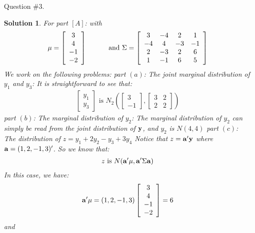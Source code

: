 \documentclass[11pt]{article}
\newtheorem{sol}{Solution}
\begin{document}
Question $\# 3.$
\begin{sol}
	For part $[A]$:\vskip 2mm
	with 
	\begin{align*}
		{\bf \mu} = \left[\begin{array}{c}3\\ 4\\ -1\\ -2\end{array}\right]\hskip 1cm \text{ and }\Sigma = \left[\begin{array}{cccc}3&-4&2&1\\ -4&4&-3&-1\\ 2&-3&2&6\\ 1&-1&6&5\end{array}\right]
	\end{align*}
	We work on the following problems:\vskip 2mm
	part $(a)$:\vskip 2mm
	The joint marginal distribution of $y_{1}$ and $y_3$:\vskip 2mm
	It is straightforward to see that:
	\begin{align*}
		\left[\begin{array}{c} y_1\\ y_3\end{array}\right] \text{ is } N_2(\left[\begin{array}{c}3 \\ -1 \end{array}\right], \left[\begin{array}{cc}3& 2\\ 2& 2\end{array}\right])
	\end{align*}
	part $(b)$: \vskip 2mm
	The marginal distribution of $y_2$:\vskip 2mm
	The marginal distribution of $y_2$ can simply be read from the joint distribution of ${\bf y}$, and $y_2$ is $N(4, 4)$\vskip 2mm
	part $(c)$:\vskip 2mm
	The distribution of $z = y_1 + 2y_2 - y_3 + 3y_4$\vskip 2mm
	Notice that $z = {\bf a}'{\bf y}$ where ${\bf a} = (1, 2, -1, 3)'$.\vskip 2mm
	So we know that:
	\begin{align*}
		z \text{ is } N({\bf a}'{\bf \mu}, {\bf a}'\Sigma {\bf a})
	\end{align*}
	In this case, we have:
	\begin{align*}
		{\bf a}'{\bf \mu} = (1, 2, -1, 3)\left[\begin{array}{c}3\\ 4\\ -1\\ -2\end{array}\right] = 6
	\end{align*}
	and

\end{sol}
\end{document}
